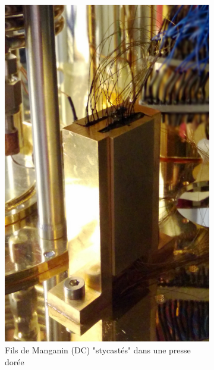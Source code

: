 \begin{figure}[h]
    \centering
    \begin{subfigure}[t]{0.48\textwidth}
        \centering
        \includegraphics[height=1.2\textwidth]{Images/Thermalisation/DC}
        \caption{Fils de Manganin (DC) "stycastés" dans une presse dorée}
    \end{subfigure}%
    ~ 
    \begin{subfigure}[t]{0.48\textwidth}
        \centering

\end{subfigure}
\end{figure}
